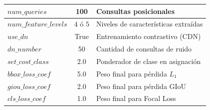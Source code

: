 \begin{table}[H]
\begin{tabular}{|l|c|l|}
        \hline
        $num\_queries$ & 100 & Consultas posicionales \\
        \hline
        $num\_feature\_levels$ & $4$ ó $5$ & Niveles de características extraídas \\
        \hline
        $use\_dn$ & True & Entrenamiento contrastivo (CDN) \\
        \hline
        $dn\_number$ & 50 & Cantidad de consultas de ruido \\
        \hline
        $set\_cost\_class$ & 2.0 & Ponderador de clase en asignación \\
        \hline
        $bbox\_loss\_coef$ & 5.0 & Peso final para pérdida $L_1$ \\
        \hline
        $giou\_loss\_coef$ & 2.0 & Peso final para pérdida GIoU \\
        \hline
        $cls\_loss\_coef$ & 1.0 & Peso final para Focal Loss \\
        \hline
    \end{tabular}
    \label{tab:6.1-hiperparametros-dino}
\end{table}